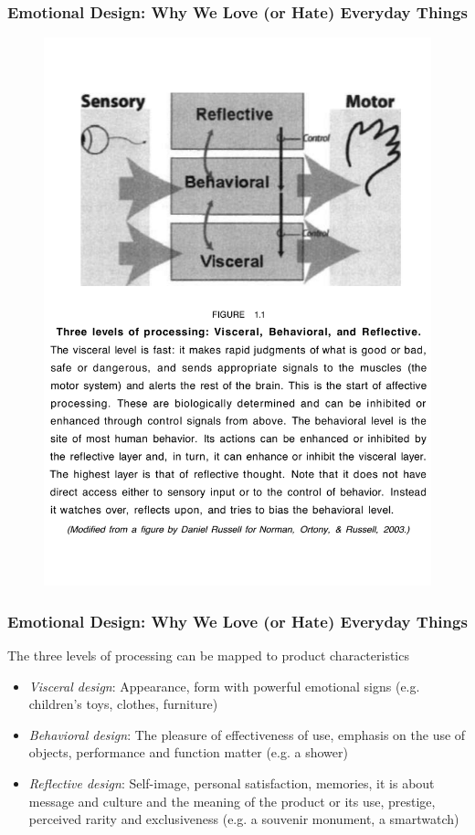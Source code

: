 \documentclass[screen, aspectratio=169]{beamer}
\begin{document}
\begin{frame}
\frametitle{Emotional Design: Why We Love (or Hate) Everyday Things}
 \begin{figure}
	\includegraphics[scale=0.23]{img/Donald-Norman-3-levels-design.pdf}
    \end{figure}
\end{frame}
%
\begin{frame}
\frametitle{Emotional Design: Why We Love (or Hate) Everyday Things}
The three levels of processing can be mapped to product characteristics \cite[p.39]{Norman.2004.Emotional}
\begin{itemize}
\item \emph{Visceral design}: Appearance, form with powerful emotional signs (e.g. children's toys, clothes, furniture)
\item \emph{Behavioral design}: The pleasure of effectiveness of use, emphasis on the use of objects, performance and function matter (e.g. a shower)
\item \emph{Reflective design}: Self-image, personal satisfaction, memories, it is about message and culture and the meaning of the product or its use, prestige, perceived rarity and exclusiveness (e.g. a souvenir monument, a smartwatch)
\end{itemize}
\end{frame}
\end{document}
